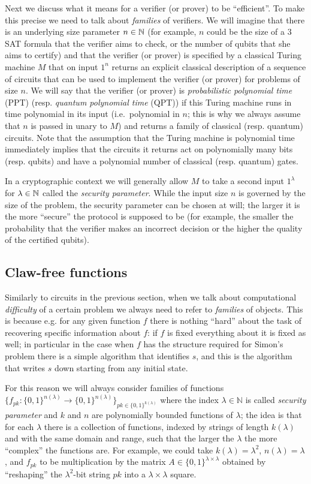 Next we discuss what it means for a verifier (or prover) to be ``efficient''. To make this precise we need to talk about \emph{families} of verifiers. We will imagine that there is an underlying size parameter $n\in \mathbb{N}$ (for example, $n$ could be the size of a $3$SAT formula that the verifier aims to check, or the number of qubits that she aims to certify) and that the verifier (or prover) is specified by a classical Turing machine $M$ that on input $1^n$ returns an explicit classical description of a sequence of circuits that can be used to implement the verifier (or prover) for problems of size $n$. We will say that the verifier (or prover) is \emph{probabilistic polynomial time} (PPT) (resp. \emph{quantum polynomial time} (QPT)) if this Turing machine runs in time polynomial in its input (i.e.\ polynomial in $n$; this is why we always assume that $n$ is passed in unary to $M$) and returns a family of classical (resp. quantum) circuits. Note that the assumption that the Turing machine is polynomial time immediately implies that the circuits it returns act on polynomially many bits (resp. qubits) and have a polynomial number of classical (resp. quantum) gates. 

In a cryptographic context we will generally allow $M$ to take a second input $1^\lambda$ for $\lambda\in \mathbb{N}$ called the \emph{security parameter}. While the input size $n$ is governed by the size of the problem, the security parameter can be chosen at will; the larger it is the more ``secure'' the protocol is supposed to be (for example, the smaller the probability that the verifier makes an incorrect decision or the higher the quality of the certified qubits). 

\subsection{Claw-free functions}

Similarly to circuits in the previous section, when we talk about computational \emph{difficulty} of a certain problem we always need to refer to \emph{families} of objects. This is because e.g. for any given function $f$ there is nothing ``hard'' about the task of recovering specific information about $f$: if $f$ is fixed everything about it is fixed as well; in particular in the case when $f$ has the structure required for Simon's problem there is a simple algorithm that identifies $s$, and this is the algorithm that writes $s$ down starting from any initial state. 

For this reason we will always consider families of functions $\{f_{pk}: \{0,1\}^{n(\lambda)} \to \{0,1\}^{n(\lambda)}\}_{pk\in\{0,1\}^{k(\lambda)}}$ where the index $\lambda \in \mathbb{N}$ is called \emph{security parameter} and $k$ and $n$ are polynomially bounded functions of $\lambda$; the idea is that for each $\lambda$ there is a collection of functions, indexed by strings of length $k(\lambda)$ and with the same domain and range, such that the larger the $\lambda$ the more ``complex'' the functions are. For example, we could take $k(\lambda)=\lambda^2$, $n(\lambda)=\lambda$, and $f_{pk}$ to be multiplication by the matrix $A\in\{0,1\}^{\lambda\times \lambda}$ obtained by ``reshaping'' the $\lambda^2$-bit string $pk$ into a $\lambda\times\lambda$ square. 

